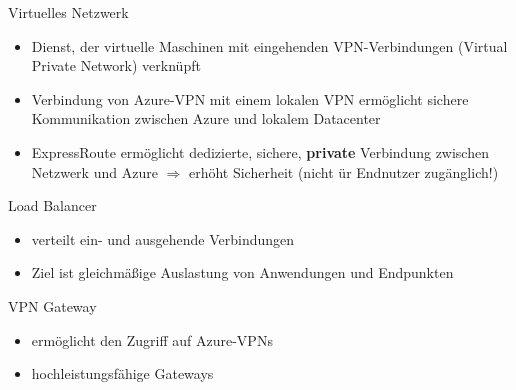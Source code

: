 \begin{flashcard}[Definition]{Virtuelles Netzwerk}
    \begin{itemize}
        \item Dienst, der virtuelle Maschinen mit eingehenden VPN-Verbindungen (Virtual Private Network) verknüpft
        \item Verbindung von Azure-VPN mit einem lokalen VPN ermöglicht sichere Kommunikation zwischen Azure und lokalem Datacenter
        \item ExpressRoute ermöglicht dedizierte, sichere, \textbf{private} Verbindung zwischen Netzwerk und Azure\newline
        $\Rightarrow$ erhöht Sicherheit (nicht ür Endnutzer zugänglich!)
    \end{itemize}

\end{flashcard}

\begin{flashcard}[Definition]{Load Balancer}
    \begin{itemize}
        \item verteilt ein- und ausgehende Verbindungen
        \item Ziel ist gleichmäßige Auslastung von Anwendungen und Endpunkten
    \end{itemize}

\end{flashcard}

\begin{flashcard}[Definition]{VPN Gateway}
    \begin{itemize}
        \item ermöglicht den Zugriff auf Azure-VPNs
        \item hochleistungsfähige Gateways
    \end{itemize}

\end{flashcard}

